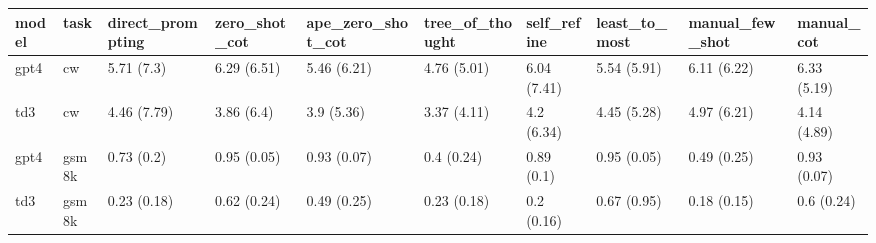 \begin{tabular}{llllllllll}
\toprule
model & task & direct_prompting & zero_shot_cot & ape_zero_shot_cot & tree_of_thought & self_refine & least_to_most & manual_few_shot & manual_cot \\
\midrule
gpt4 & cw & 5.71 (7.3) & 6.29 (6.51) & 5.46 (6.21) & 4.76 (5.01) & 6.04 (7.41) & 5.54 (5.91) & 6.11 (6.22) & 6.33 (5.19) \\
td3 & cw & 4.46 (7.79) & 3.86 (6.4) & 3.9 (5.36) & 3.37 (4.11) & 4.2 (6.34) & 4.45 (5.28) & 4.97 (6.21) & 4.14 (4.89) \\
gpt4 & gsm8k & 0.73 (0.2) & 0.95 (0.05) & 0.93 (0.07) & 0.4 (0.24) & 0.89 (0.1) & 0.95 (0.05) & 0.49 (0.25) & 0.93 (0.07) \\
td3 & gsm8k & 0.23 (0.18) & 0.62 (0.24) & 0.49 (0.25) & 0.23 (0.18) & 0.2 (0.16) & 0.67 (0.95) & 0.18 (0.15) & 0.6 (0.24) \\
\bottomrule
\end{tabular}
